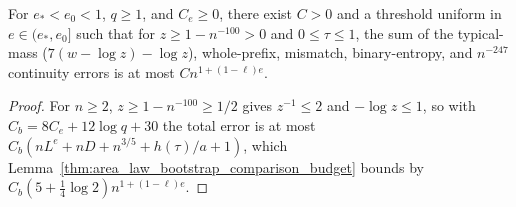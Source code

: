 \begin{lemma}
    \label{thm:arealaw-bootstrap-restored-budget}
    \leanok
    For $e_*<e_0<1$, $q\geq1$, and $C_e\geq0$, there exist $C>0$ and a threshold uniform in
    $e\in(e_*,e_0]$ such that for $z\ge1-n^{-100}>0$ and $0\leq\tau\leq1$, the sum of the
    typical-mass ($7(w-\log z)-\log z$), whole-prefix, mismatch, binary-entropy, and
    $n^{-247}$ continuity errors is at most $C n^{1+(1-\ell)e}$.
\end{lemma}
\begin{proof}
    \leanok
    For $n\geq2$, $z\ge1-n^{-100}\ge1/2$ gives $z^{-1}\leq2$ and $-\log z\leq1$, so with
    $C_b=8C_e+12\log q+30$ the total error is at most $C_b(nL^e+nD+n^{3/5}+h(\tau)/a+1)$,
    which Lemma~\ref{thm:area_law_bootstrap_comparison_budget} bounds by
    $C_b(5+\frac{1}{4}\log2)n^{1+(1-\ell)e}$.
\end{proof}



